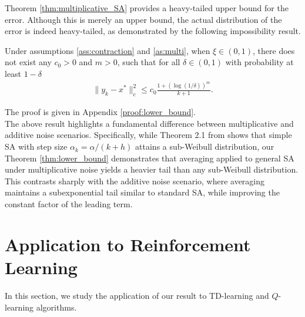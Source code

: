 \documentclass[letterpaper, 10 pt]{article}
\begin{document}
Theorem \ref{thm:multiplicative_SA} provides a heavy-tailed upper bound for the error. Although this is merely an upper bound, the actual distribution of the error is indeed heavy-tailed, as demonstrated by the following impossibility result.

\begin{theorem}\label{thm:lower_bound}
Under assumptions \ref{ass:contraction} and \ref{as:multi}, when $\xi\in (0,1)$, there does not exist any $c_0>0$ and $m>0$, such that for all $\delta\in(0,1)$ with probability at least $1-\delta$
\begin{align*}
    \|y_k-x^*\|_c^2\leq c_0\frac{1+(\log(1/\delta))^m}{k+1}.
\end{align*}
\end{theorem}
The proof is given in Appendix \ref{proof:lower_bound}.\\

The above result highlights a fundamental difference between multiplicative and additive noise scenarios. Specifically, while Theorem 2.1 from \cite{chen2023concentration} shows that simple SA with step size $\alpha_k=\alpha/(k+h)$ attains a sub-Weibull distribution, our Theorem \ref{thm:lower_bound} demonstrates that averaging applied to general SA under multiplicative noise yields a heavier tail than any sub-Weibull distribution. This contrasts sharply with the additive noise scenario, where averaging maintains a subexponential tail similar to standard SA, while improving the constant factor of the leading term.


\section{Application to Reinforcement Learning} \label{sec:RL}

In this section, we study the application of our result to TD-learning and $Q$-learning algorithms.
\end{document}
